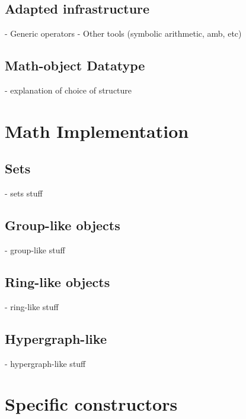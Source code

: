 \documentclass{article}
\begin{document}
        \subsection{Adapted infrastructure}
            
            - Generic operators
            - Other tools (symbolic arithmetic, amb, etc)
        
        
        \subsection{Math-object Datatype}
            
            - explanation of choice of structure
    
    
    \section{Math Implementation}
        
        \subsection{Sets}
            
            - sets stuff
        
        
        \subsection{Group-like objects}
            
            - group-like stuff
        
        
        \subsection{Ring-like objects}
            
            - ring-like stuff
        
        
        \subsection{Hypergraph-like}
            
            - hypergraph-like stuff
    
    
    \section{Specific constructors}
        
\end{document}
